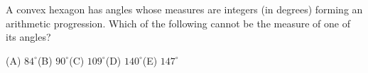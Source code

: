 A convex hexagon has angles whose measures are integers (in degrees) forming an arithmetic progression. Which of the following cannot be the measure of one of its angles?

(A) $84^\circ$\qquad (B) $90^\circ$\qquad (C) $109^\circ$\qquad (D) $140^\circ$\qquad (E) $147^\circ$
